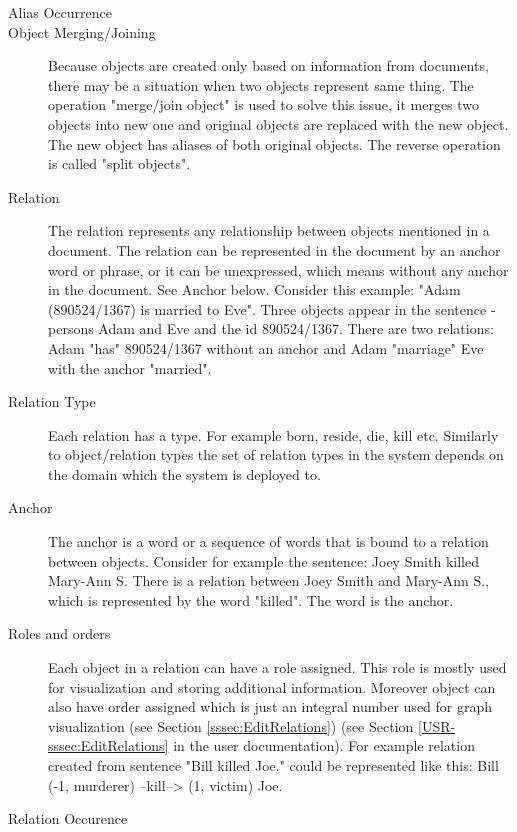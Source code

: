 \begin{description}
\item[Alias Occurrence]

\item[Object Merging/Joining]
Because objects are created only based on information from documents, there may
be a situation when two objects represent same thing. The operation "merge/join
object" is used to solve this issue, it merges two objects into new one and
original objects are replaced with the new object. The new object has aliases of
both original objects. The reverse operation is called "split objects".

\item[Relation]
The relation represents any relationship between objects mentioned in a
document. The relation can be represented in the document by an anchor word or
phrase, or it can be unexpressed, which means without any anchor in the
document. See Anchor below.
Consider this example: "Adam (890524/1367) is married to Eve". Three objects
appear in the sentence - persons Adam and Eve and the id 890524/1367. There
are two relations: Adam "has" 890524/1367 without an anchor and Adam "marriage"
Eve with the anchor "married".

\item[Relation Type]
Each relation has a type. For example born, reside, die, kill etc. Similarly to
object/relation types the set of relation types in the system depends on the
domain which the system is deployed to.

\item[Anchor]
The anchor is a word or a sequence of words that is bound to a relation between
objects. Consider for example the sentence: Joey Smith killed Mary-Ann S. There
is a relation between Joey Smith and Mary-Ann S., which is represented by the
word "killed". The word is the anchor.

\item[Roles and orders]
Each object in a relation can have a role assigned. This role is mostly used
for visualization and storing additional information. Moreover object can also
have order assigned which is just an integral number used for graph
visualization\ifdefined\USRDOC{} (see Section \ref{sssec:EditRelations})\fi{}
\ifdefined\DEVDOC{} (see Section \ref{USR-sssec:EditRelations} in the user
documentation)\fi{}. For example relation created from sentence
"Bill killed Joe." could be represented like this:
Bill (-1, murderer) --kill--> (1, victim) Joe.

\item[Relation Occurence]
\end{description}

